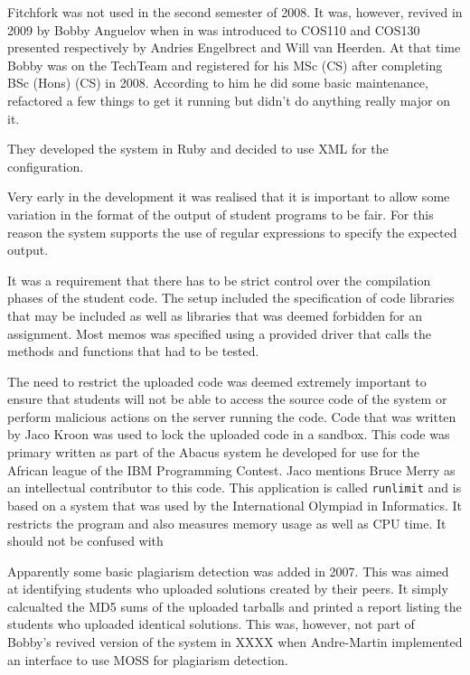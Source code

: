 Fitchfork was not used in the second semester of 2008. It was, however, revived in 2009 by Bobby Anguelov when in was introduced to COS110 and COS130 presented respectively by Andries Engelbrect and Will van Heerden. At that time Bobby was on the TechTeam and registered for his MSc (CS) after completing BSc (Hons) (CS) in 2008. According to him he did some basic maintenance, refactored a few things to get it running but didn't do anything really major on it.  


They developed the system in Ruby and decided to use XML for the configuration. 

Very early in the development it was realised that it is important to allow some variation in the format of the output of student programs to be fair. For this reason the system supports the use of regular expressions to specify the expected output.  

It was a requirement that there has to be strict control over the compilation phases of the student code. The setup included the specification of code libraries that may be included as well as libraries that was deemed forbidden for an assignment. Most memos was specified using a provided driver that calls the methods and functions that had to be tested.   

The need to restrict the uploaded code was deemed extremely important to ensure that students will not be able to access the source code of the system or perform malicious actions on the server running the code. Code that was written by Jaco Kroon was used to lock the uploaded code in a sandbox. This code was primary written as part of the Abacus system he developed for use for the African league of the IBM Programming Contest. Jaco mentions Bruce Merry as an intellectual contributor to this code. This  application is called {\tt runlimit} and is based on a system that was used by the International Olympiad in Informatics. It restricts the program and also measures memory usage as well as CPU time. It should not be confused with 

Apparently some basic plagiarism detection was added in 2007. This was aimed at identifying students who uploaded solutions created by their peers. It simply calcualted the MD5 sums of the uploaded tarballs and printed a report listing the students who uploaded identical solutions. This was, however, not part of Bobby's revived version of the system in XXXX when Andre-Martin implemented an interface to use MOSS for plagiarism detection. 